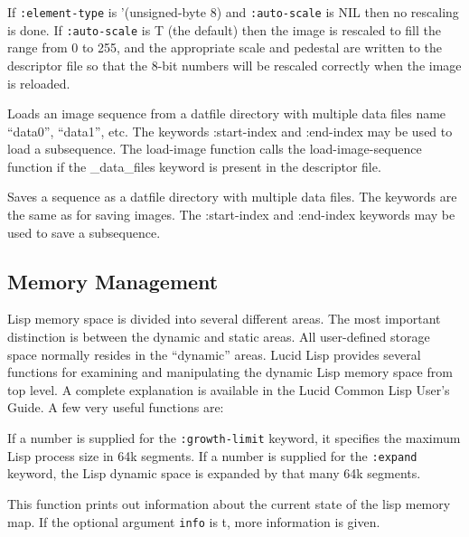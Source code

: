 \begin{description}
If {\tt :element-type} is '(unsigned-byte 8) and {\tt :auto-scale} is
NIL then no rescaling is done.  If {\tt :auto-scale} is T (the
default) then the image is rescaled to fill the range from 0 to 255,
and the appropriate scale and pedestal are written to the descriptor
file so that the 8-bit numbers will be rescaled correctly when the
image is reloaded.

\item{}
Loads an image sequence from a datfile directory with multiple data
files name ``data0'', ``data1'', etc.  The keywords :start-index and
:end-index may be used to load a subsequence.  The load-image function
calls the load-image-sequence function if the \_data\_files keyword is
present in the descriptor file.

\item{}
Saves a sequence as a datfile directory with multiple data files.  The
keywords are the same as for saving images.  The :start-index and
:end-index keywords may be used to save a subsequence.
\end{description}


\subsection{Memory Management}
\label{sec:memory}

Lisp memory space is divided into several different areas.  The most
important distinction is between the dynamic and static areas.  All
user-defined storage space normally resides in the ``dynamic'' areas.
Lucid Lisp provides several functions for examining and manipulating
the dynamic Lisp memory space from top level.  A complete explanation
is available in the Lucid Common Lisp User's Guide.  A few very useful
functions are:
\begin{description}
\item{}
If a number is supplied for the {\tt :growth-limit} keyword, it specifies
the maximum Lisp process size in 64k segments.  If a number is
supplied for the {\tt :expand} keyword, the Lisp dynamic space is expanded
by that many 64k segments.

\item{}
This function prints out information about the current state of the
lisp memory map.  If the optional argument {\tt info} is t, more
information is given.
\end{description}

